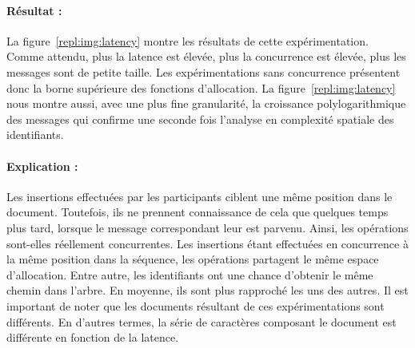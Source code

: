 \paragraph{Résultat :} La figure~\ref{repl:img:latency} montre les résultats de
cette expérimentation. Comme attendu, plus la latence est élevée, plus
la concurrence est élevée, plus les messages sont de petite taille. Les
expérimentations sans concurrence présentent donc la borne supérieure des
fonctions d'allocation. La figure~\ref{repl:img:latency} nous montre aussi, avec
une plus fine granularité, la croissance polylogarithmique des messages qui
confirme une seconde fois l'analyse en complexité spatiale des identifiants.

\paragraph{Explication :} Les insertions effectuées par les participants ciblent
une même position dans le document. Toutefois, ils ne prennent connaissance de
cela que quelques temps plus tard, lorsque le message correspondant leur est
parvenu. Ainsi, les opérations sont-elles réellement concurrentes. Les
insertions étant effectuées en concurrence à la même position dans la séquence,
les opérations partagent le même espace d'allocation. Entre autre, les
identifiants ont une chance d'obtenir le même chemin dans l'arbre. En moyenne,
ils sont plus rapproché les uns des autres. Il est important de noter que les
documents résultant de ces expérimentations sont différents. En d'autres termes,
la série de caractères composant le document est différente en fonction de la
latence.


